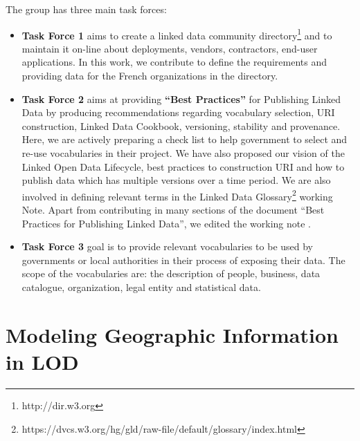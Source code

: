 \documentclass[a4paper,11pt]{report}
\begin{document}
The group has three main task forces:
\begin{itemize}
\item \textbf{Task Force 1} aims to create a linked data community directory\footnote{http://dir.w3.org} and to maintain it on-line about deployments, vendors, contractors, end-user applications. In this work, we contribute to define the requirements and providing data for the French organizations in the directory.
\item \textbf{Task Force 2} aims at providing \textbf{``Best Practices''} for Publishing Linked Data by producing recommendations regarding vocabulary selection, URI construction, Linked Data Cookbook, versioning, stability and provenance. Here, we are actively preparing a check list to help government to select and re-use vocabularies in their project. We have also proposed our vision of the Linked Open Data Lifecycle, best practices to construction URI and how to publish data which has multiple versions over a time period. We are also involved in defining relevant terms in the Linked Data Glossary\footnote{https://dvcs.w3.org/hg/gld/raw-file/default/glossary/index.html} working Note. Apart from contributing in many sections of the document ``Best Practices for Publishing Linked Data'', we edited the working note \cite{wood2012}.

\item \textbf{Task Force 3} goal is to  provide relevant vocabularies to be used by governments or local authorities in their process of exposing their data. The scope of the vocabularies are: the description of people, business, data catalogue, organization, legal entity and statistical data. 
\end{itemize}


\chapter{Modeling Geographic Information in LOD}
\end{document}
